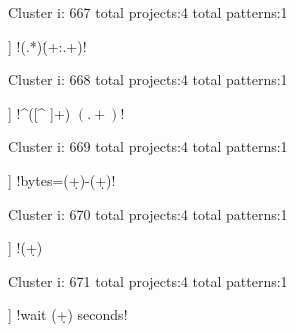 Cluster i: 667
total projects:4
total patterns:1
\begin{multicols}{1}
\begin{description}[noitemsep,topsep=0pt]
\item [[4] ] \cverb!(.*)\.(\w+:.+\s)!
\end{description}
\end{multicols}







Cluster i: 668
total projects:4
total patterns:1
\begin{multicols}{1}
\begin{description}[noitemsep,topsep=0pt]
\item [[4] ] \cverb!^([^ ]+) \((.+)\)!
\end{description}
\end{multicols}







Cluster i: 669
total projects:4
total patterns:1
\begin{multicols}{1}
\begin{description}[noitemsep,topsep=0pt]
\item [[4] ] \cverb!bytes=(\d+)-(\d+)!
\end{description}
\end{multicols}







Cluster i: 670
total projects:4
total patterns:1
\begin{multicols}{1}
\begin{description}[noitemsep,topsep=0pt]
\item [[4] ] \cverb!(\d+)%
\end{description}
\end{multicols}







Cluster i: 671
total projects:4
total patterns:1
\begin{multicols}{1}
\begin{description}[noitemsep,topsep=0pt]
\item [[4] ] \cverb!wait (\d+) seconds!
\end{description}
\end{multicols}







